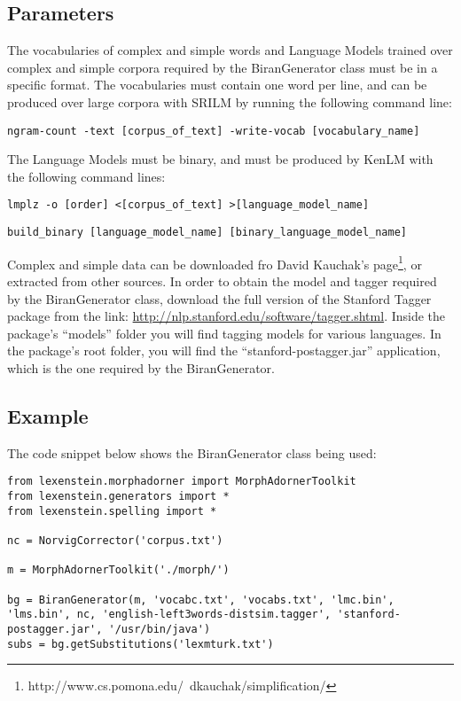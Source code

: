 \subsection{Parameters}

The vocabularies of complex and simple words and Language Models trained over complex and simple corpora required by the BiranGenerator class must be in a specific format. The vocabularies must contain one word per line, and can be produced over large corpora with SRILM by running the following command line:

\begin{lstlisting}
ngram-count -text [corpus_of_text] -write-vocab [vocabulary_name]
\end{lstlisting}

The Language Models must be binary, and must be produced by KenLM with the following command lines:

\begin{lstlisting}
lmplz -o [order] <[corpus_of_text] >[language_model_name]
\end{lstlisting}
\begin{lstlisting}
build_binary [language_model_name] [binary_language_model_name]
\end{lstlisting}

Complex and simple data can be downloaded fro David Kauchak's page\footnote{http://www.cs.pomona.edu/~dkauchak/simplification/}, or extracted from other sources. In order to obtain the model and tagger required by the BiranGenerator class, download the full version of the Stanford Tagger package from the link: \url{http://nlp.stanford.edu/software/tagger.shtml}. Inside the package's ``models'' folder you will find tagging models for various languages. In the package's root folder, you will find the ``stanford-postagger.jar'' application, which is the one required by the BiranGenerator.

\subsection{Example}

The code snippet below shows the BiranGenerator class being used:

\begin{lstlisting}
from lexenstein.morphadorner import MorphAdornerToolkit
from lexenstein.generators import *
from lexenstein.spelling import *

nc = NorvigCorrector('corpus.txt')

m = MorphAdornerToolkit('./morph/')

bg = BiranGenerator(m, 'vocabc.txt', 'vocabs.txt', 'lmc.bin', 'lms.bin', nc, 'english-left3words-distsim.tagger', 'stanford-postagger.jar', '/usr/bin/java')
subs = bg.getSubstitutions('lexmturk.txt')
\end{lstlisting}